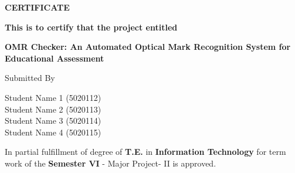 \documentclass[oneside,12pt]{Classes/CUEDthesisPSnPDF}
\theoremstyle{definition}
\begin{document}
\setcounter{secnumdepth}{3}
\setcounter{tocdepth}{3}
\renewcommand{\chaptermark}[1]{\markboth{#1}{}}
\renewcommand{\sectionmark}[1]{\markright{#1}{}}
\rhead{} \chead{} \lhead{\leftmark} \rfoot{\footnotesize \thepage} \cfoot{} 
\frontmatter %
\begin{titlepage}

 \begin{center} \begin{Large} \textbf{CERTIFICATE}\end{Large} \end{center} 
\vspace*{1\baselineskip}
\begin{center} \begin{small} \textbf{This is to certify that the project entitled }\end{small} \end{center} 
 \begin{center} \begin{Large} \textbf{OMR Checker: An Automated Optical Mark Recognition System for Educational Assessment}\end{Large} \end{center}
\vspace*{1\baselineskip}
		\center
		Submitted By\\
		\vspace*{1\baselineskip}
		\begin{small}
			Student Name 1 (5020112)\\
			Student Name 2 (5020113)\\
			Student Name 3 (5020114)\\
			Student Name 4 (5020115)\\
                            		\end{small}
\vspace*{1\baselineskip}
In partial fulfillment of degree of \textbf{T.E.} in \textbf{Information Technology} for term work of the \textbf{Semester VI} - Major Project- II  is approved.
\vspace*{1\baselineskip}



\end{titlepage}
\end{document}
